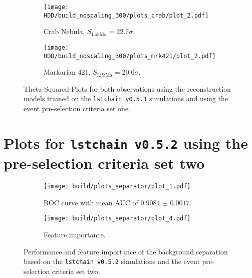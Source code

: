 \begin{figure}
    \centering
    \begin{subfigure}{0.49\textwidth}
        \centering
        \texttt{[image: HDD/build\_noscaling\_300/plots\_crab/plot\_2.pdf]}
        \caption{Crab Nebula, $S_\text{Li\&Ma} = \num{22.7} \sigma$.}
        \label{fig:crab_oldMC_300}
    \end{subfigure}
    \hfill
    \begin{subfigure}{0.49\textwidth}
        \centering
        \texttt{[image: HDD/build\_noscaling\_300/plots\_mrk421/plot\_2.pdf]}
        \caption{Markarian 421, $S_\text{Li\&Ma} = \num{20.6} \sigma$.}
        \label{fig:mrk_oldMC_300}
    \end{subfigure}
    \caption{Theta-Squared-Plots for both observations using the reconstruction models trained on the \texttt{lstchain v0.5.1} simulations and using 
        the event pre-selection criteria set one.
    }
    \label{fig:obs_oldMC_300}
\end{figure}


\section{Plots for \texttt{lstchain v0.5.2} using the pre-selection criteria set two}
\begin{figure}
    \centering
    \begin{subfigure}{0.49\textwidth}
        \centering
        \texttt{[image: build/plots\_separator/plot\_1.pdf]}
        \caption{ROC curve with mean AUC of $\num{0.9084(17)}$.}
        \label{fig:separator_newMC_150}
    \end{subfigure}
    \hfill
    \begin{subfigure}{0.49\textwidth}
        \centering
        \texttt{[image: build/plots\_separator/plot\_4.pdf]}
        \caption{Feature importance.}
        \label{fig:separator_newMC_150_feature}
    \end{subfigure}
    \caption{Performance and feature importance of the background separation based on the \texttt{lstchain v0.5.2} simulations and the event pre-selection criteria set two.}
\end{figure}

